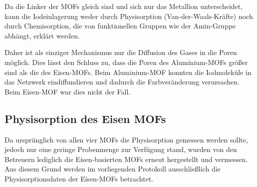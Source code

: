 \documentclass[12pt, a4paper]{article}
\begin{document}
\noindent
Da die Linker der MOFs gleich sind und sich nur das Metallion unterscheidet, kann die Iodeinlagerung weder durch Physisorption (Van-der-Waals-Kräfte) noch durch Chemisorption, die von funktionellen Gruppen wie der Amin-Gruppe abhängt, erklärt werden.

\noindent
Daher ist als einziger Mechanismus nur die Diffusion des Gases in die Poren möglich. Dies lässt den Schluss zu, dass die Poren des Aluminium-MOFs größer sind als die des Eisen-MOFs. Beim Aluminium-MOF konnten die Iodmoleküle in das Netzwerk eindiffundieren und dadurch die Farbveränderung verursachen. Beim Eisen-MOF war dies nicht der Fall.
\newpage

\subsection{Physisorption des Eisen MOFs}
Da ursprünglich von allen vier MOFs die Physisorption gemessen werden sollte, jedoch nur eine geringe Probenmenge zur Verfügung stand, wurden von den Betreuern lediglich die Eisen-basierten MOFs erneut hergestellt und vermessen. Aus diesem Grund werden im vorliegenden Protokoll ausschließlich die Physisorptionsdaten der Eisen-MOFs betrachtet.
\end{document}
